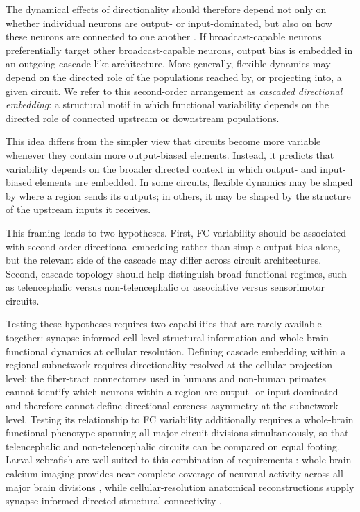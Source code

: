 \documentclass[9pt,twocolumn,twoside]{pnas-new}
\begin{document}
The dynamical effects of directionality should therefore depend not only on whether individual neurons are output- or input-dominated, but also on how these neurons are connected to one another \citep{ratnarajah2013structural,seguin2019inferring,harriger2012rich,esposito2014measuring,hadjiabadi2021maximally}. If broadcast-capable neurons preferentially target other broadcast-capable neurons, output bias is embedded in an outgoing cascade-like architecture. More generally, flexible dynamics may depend on the directed role of the populations reached by, or projecting into, a given circuit. We refer to this second-order arrangement as \emph{cascaded directional embedding}: a structural motif in which functional variability depends on the directed role of connected upstream or downstream populations.

This idea differs from the simpler view that circuits become more variable whenever they contain more output-biased elements. Instead, it predicts that variability depends on the broader directed context in which output- and input-biased elements are embedded. In some circuits, flexible dynamics may be shaped by where a region sends its outputs; in others, it may be shaped by the structure of the upstream inputs it receives. 

This framing leads to two hypotheses. First, FC variability should be associated with second-order directional embedding rather than simple output bias alone, but the relevant side of the cascade may differ across circuit architectures. Second, cascade topology should help distinguish broad functional regimes, such as telencephalic versus non-telencephalic or associative versus sensorimotor circuits.


Testing these hypotheses requires two capabilities that are rarely available together: synapse-informed cell-level structural information and whole-brain functional dynamics at cellular resolution. Defining cascade embedding within a regional subnetwork requires directionality resolved at the cellular projection level: the fiber-tract connectomes used in humans and non-human primates cannot identify which neurons within a region are output- or input-dominated and therefore cannot define directional coreness asymmetry at the subnetwork level. Testing its relationship to FC variability additionally requires a whole-brain functional phenotype spanning all major circuit divisions simultaneously, so that telencephalic and non-telencephalic circuits can be compared on equal footing. Larval zebrafish are well suited to this combination of requirements \citep{kinkhabwala2011structural,ahrens2013whole,cong2017rapid,kim2017pan,chen2018brain,kunst2019cellular}: whole-brain calcium imaging provides near-complete coverage of neuronal activity across all major brain divisions \citep{chen2018brain}, while cellular-resolution anatomical reconstructions supply synapse-informed directed structural connectivity \citep{kunst2019cellular,hildebrand2017wholebrain}.
\end{document}
